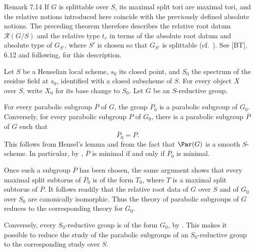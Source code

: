 \begin{sgastatement}{Remark 7.14}
If \(G\) is splittable over \(S\), its maximal split tori are
maximal tori, and the relative notions introduced here coincide
with the previously defined absolute notions.  The preceding
theorem therefore describes the relative root datum
\(\mathcal R(G/S)\) and the relative type \(t_r\) in terms of the
absolute root datum and absolute type of \(G_{S'}\), where \(S'\) is
chosen so that \(G_{S'}\) is splittable
\textup{(cf.\ )}.  See \textup{[BT]}, 6.12
and following, for this description.
\end{sgastatement}


Let \(S\) be a Henselian local scheme, \(s_0\) its closed point, and
\(S_0\) the spectrum of the residue field at \(s_0\), identified
with a closed subscheme of \(S\).  For every object \(X\) over
\(S\), write \(X_0\) for its base change to \(S_0\).  Let \(G\) be
an \(S\)-reductive group.

For every parabolic subgroup \(\overline P\) of \(G\), the group
\(\overline P_0\) is a parabolic subgroup of \(G_0\).  Conversely,
for every parabolic subgroup \(P\) of \(G_0\), there is a parabolic
subgroup \(\overline P\) of \(G\) such that
\[
 \overline P_0=P.
\]
This follows from Hensel's lemma and from the fact that \(\Par(G)\)
is a smooth \(S\)-scheme.  In particular, by ,
\(\overline P\) is minimal if and only if \(\overline P_0\) is
minimal.

Once such a subgroup \(\overline P\) has been chosen, the same
argument shows that every maximal split subtorus of
\(\overline P_0\) is of the form \(T_0\), where \(T\) is a maximal
split subtorus of \(\overline P\).  It follows readily that the
relative root data of \(G\) over \(S\) and of \(G_0\) over \(S_0\)
are canonically isomorphic.  Thus the theory of parabolic subgroups
of \(G\) reduces to the corresponding theory for \(G_0\).

Conversely, every \(S_0\)-reductive group is of the form \(G_0\), by
.  This makes it possible to reduce the
study of the parabolic subgroups of an \(S_0\)-reductive group to
the corresponding study over \(S\).
